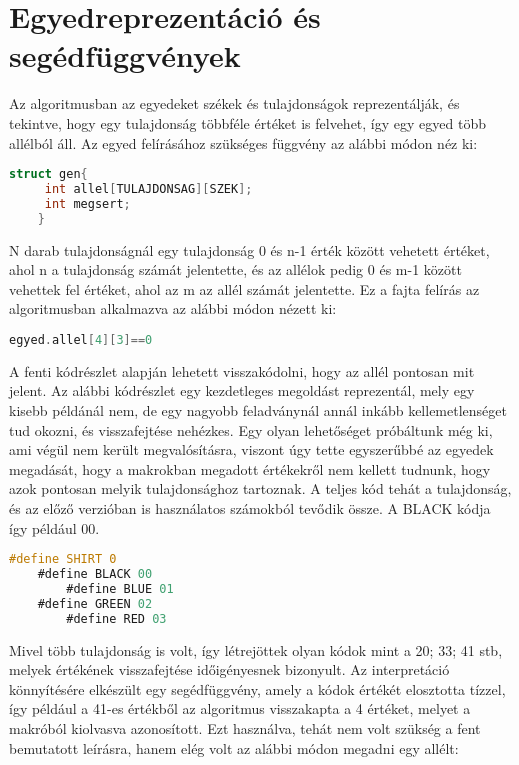 \documentclass[12ppt,a4paper,oneside]{report}
\begin{document}
    \section{Egyedreprezentáció és segédfüggvények} %

	
			Az algoritmusban az egyedeket székek és tulajdonságok reprezentálják, és tekintve, hogy egy tulajdonság többféle értéket is felvehet, így egy egyed több allélból áll. Az egyed felírásához szükséges függvény az alábbi módon néz ki:

	\begin{lstlisting}[frame=single, language=C]
	struct gen{
   	 int allel[TULAJDONSAG][SZEK];
   	 int megsert;
    }
	\end{lstlisting}
	
			N darab tulajdonságnál egy tulajdonság 0 és n-1 érték között vehetett értéket, ahol n a tulajdonság számát jelentette, és az allélok pedig 0 és m-1 között vehettek fel értéket, ahol az m az allél számát jelentette. Ez a fajta felírás az algoritmusban alkalmazva az alábbi 		módon nézett ki:
	\begin{lstlisting}[frame=single, language=C]
	egyed.allel[4][3]==0
	\end{lstlisting}
			
	A fenti kódrészlet alapján lehetett visszakódolni, hogy az allél pontosan mit jelent. Az alábbi kódrészlet egy kezdetleges megoldást reprezentál, mely egy kisebb példánál nem, de egy nagyobb feladványnál annál inkább kellemetlenséget tud okozni, és visszafejtése nehézkes.
	Egy olyan lehetőséget próbáltunk még ki, ami végül nem került megvalósításra, viszont úgy tette egyszerűbbé az egyedek megadását, hogy a makrokban megadott értékekről nem kellett tudnunk, hogy azok pontosan melyik tulajdonsághoz tartoznak. A teljes kód tehát a tulajdonság, és az előző verzióban is használatos számokból tevődik össze. A BLACK kódja így például 00. 
	\begin{lstlisting}[frame=single, language=C]
	#define SHIRT 0
 	#define BLACK 00
    	#define BLUE 01
	#define GREEN 02
    	#define RED 03 
	\end{lstlisting}
			Mivel több tulajdonság is volt, így létrejöttek olyan kódok mint a 20; 33; 41 stb, melyek értékének visszafejtése időigényesnek bizonyult. Az interpretáció könnyítésére elkészült egy segédfüggvény, amely a kódok értékét elosztotta tízzel, így például a 41-es értékből az algoritmus visszakapta a 4 értéket, melyet a makróból kiolvasva azonosított. 
Ezt használva, tehát nem volt szükség a fent bemutatott leírásra, hanem elég volt az alábbi módon megadni egy allélt:
\end{document}
